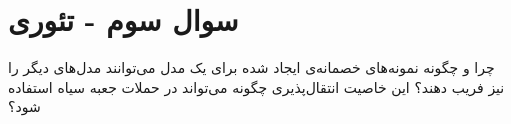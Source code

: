 \section{سوال سوم - تئوری}
چرا و چگونه نمونه‌های خصمانه‌ی ایجاد شده برای یک مدل می‌توانند مدل‌های دیگر را نیز فریب دهند؟ این خاصیت انتقال‌پذیری چگونه می‌تواند در حملات جعبه سیاه استفاده شود؟


\begin{qsolve}
	
\end{qsolve}